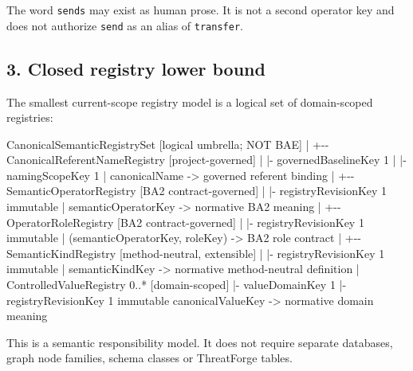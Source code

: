 \documentclass[
  10pt,
  a4paper,
]{article}
\newenvironment{Shaded}{}{}
\newcommand{\NormalTok}[1]{#1}
\begin{document}
The word \texttt{sends} may exist as human prose. It is not a second
operator key and does not authorize \texttt{send} as an alias of
\texttt{transfer}.

\subsection{3. Closed registry lower
bound}\label{3-closed-registry-lower-bound}

The smallest current-scope registry model is a logical set of
domain-scoped registries:

\begin{Shaded}
\begin{Highlighting}[]
\NormalTok{CanonicalSemanticRegistrySet                    [logical umbrella; NOT BAE]}
\NormalTok{|}
\NormalTok{+{-}{-} CanonicalReferentNameRegistry                [project{-}governed]}
\NormalTok{|    |{-} governedBaselineKey                 1}
\NormalTok{|    |{-} namingScopeKey                      1}
\NormalTok{|    \textasciigrave{}{-} canonicalName {-}\textgreater{} governed referent binding}
\NormalTok{|}
\NormalTok{+{-}{-} SemanticOperatorRegistry                     [BA2 contract{-}governed]}
\NormalTok{|    |{-} registryRevisionKey                 1 immutable}
\NormalTok{|    \textasciigrave{}{-} semanticOperatorKey {-}\textgreater{} normative BA2 meaning}
\NormalTok{|}
\NormalTok{+{-}{-} OperatorRoleRegistry                         [BA2 contract{-}governed]}
\NormalTok{|    |{-} registryRevisionKey                 1 immutable}
\NormalTok{|    \textasciigrave{}{-} (semanticOperatorKey, roleKey) {-}\textgreater{} BA2 role contract}
\NormalTok{|}
\NormalTok{+{-}{-} SemanticKindRegistry                         [method{-}neutral, extensible]}
\NormalTok{|    |{-} registryRevisionKey                 1 immutable}
\NormalTok{|    \textasciigrave{}{-} semanticKindKey {-}\textgreater{} normative method{-}neutral definition}
\NormalTok{|}
\NormalTok{\textasciigrave{}{-}{-} ControlledValueRegistry                 0..* [domain{-}scoped]}
\NormalTok{     |{-} valueDomainKey                       1}
\NormalTok{     |{-} registryRevisionKey                  1 immutable}
\NormalTok{     \textasciigrave{}{-} canonicalValueKey {-}\textgreater{} normative domain meaning}
\end{Highlighting}
\end{Shaded}

This is a semantic responsibility model. It does not require separate
databases, graph node families, schema classes or ThreatForge tables.
\end{document}
